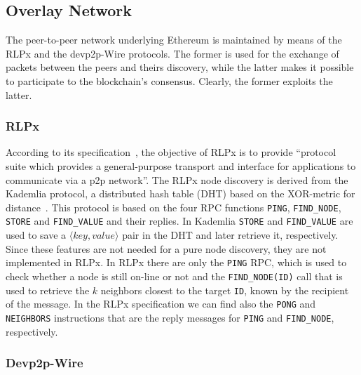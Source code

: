 \subsection{Overlay Network}
The peer-to-peer network underlying Ethereum is maintained by means of the 
RLPx and the devp2p-Wire protocols.
The former is used for the exchange of packets between the peers and theirs
discovery, while the latter makes it possible to participate to the 
blockchain's consensus. Clearly, the former exploits the latter.

\subsubsection{RLPx}
According to its specification~\cite{}, the objective of RLPx is to
provide ``protocol suite which 
provides a general-purpose transport and interface for applications to
communicate via a p2p network''.
The RLPx node discovery is derived from the Kademlia protocol,
a distributed hash table (DHT) based on the XOR-metric for 
distance~\cite{bib:kademlia}.
This protocol is based on the four RPC functions \verb|PING|, \verb|FIND_NODE|,
\verb|STORE| and \verb|FIND_VALUE| and their replies.
In Kademlia \verb|STORE| and \verb|FIND_VALUE| are used to save a 
$\langle key, value\rangle$ pair in the DHT and later retrieve it, respectively.
Since these features are not needed for a pure node discovery, they
are not implemented in RLPx.
In RLPx there are only the \verb|PING| RPC, which is used to check whether a
node is still on-line or not and the \verb|FIND_NODE(ID)| call that is used to
retrieve the $k$ neighbors closest to the target \verb|ID|, known by the
recipient of the message. In the RLPx specification we can find also 
the \verb|PONG| and \verb|NEIGHBORS| instructions that are the reply messages
for \verb|PING| and \verb|FIND_NODE|, respectively.





\subsubsection{Devp2p-Wire}

